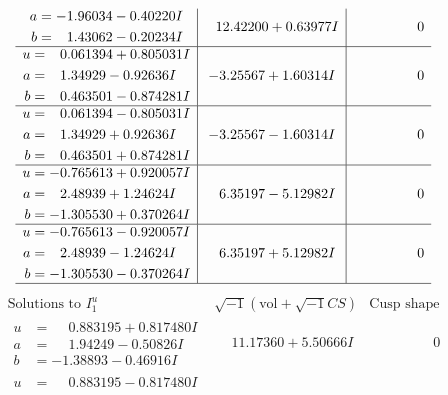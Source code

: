 \documentclass[1p]{elsarticle_modified}
\theoremstyle{definition}
\newcommand{\I}{\sqrt{-1}}
\begin{document}
$$\begin{array}{c|c|c}
\begin{aligned}
a &= -1.96034 - 0.40220 I \\
b &= \phantom{-}1.43062 - 0.20234 I\end{aligned}
 & \phantom{-}12.42200 + 0.63977 I & \phantom{-0.000000 } 0 \\ \hline\begin{aligned}
u &= \phantom{-}0.061394 + 0.805031 I \\
a &= \phantom{-}1.34929 - 0.92636 I \\
b &= \phantom{-}0.463501 - 0.874281 I\end{aligned}
 & -3.25567 + 1.60314 I & \phantom{-0.000000 } 0 \\ \hline\begin{aligned}
u &= \phantom{-}0.061394 - 0.805031 I \\
a &= \phantom{-}1.34929 + 0.92636 I \\
b &= \phantom{-}0.463501 + 0.874281 I\end{aligned}
 & -3.25567 - 1.60314 I & \phantom{-0.000000 } 0 \\ \hline\begin{aligned}
u &= -0.765613 + 0.920057 I \\
a &= \phantom{-}2.48939 + 1.24624 I \\
b &= -1.305530 + 0.370264 I\end{aligned}
 & \phantom{-}6.35197 - 5.12982 I & \phantom{-0.000000 } 0 \\ \hline\begin{aligned}
u &= -0.765613 - 0.920057 I \\
a &= \phantom{-}2.48939 - 1.24624 I \\
b &= -1.305530 - 0.370264 I\end{aligned}
 & \phantom{-}6.35197 + 5.12982 I & \phantom{-0.000000 } 0\\
 \hline 
 \end{array}$$\newpage$$\begin{array}{c|c|c}  
\text{Solutions to }I^u_{1}& \I (\text{vol} + \sqrt{-1}CS) & \text{Cusp shape}\\
 \hline 
\begin{aligned}
u &= \phantom{-}0.883195 + 0.817480 I \\
a &= \phantom{-}1.94249 - 0.50826 I \\
b &= -1.38893 - 0.46916 I\end{aligned}
 & \phantom{-}11.17360 + 5.50666 I & \phantom{-0.000000 } 0 \\ \hline\begin{aligned}
u &= \phantom{-}0.883195 - 0.817480 I \\

\end{aligned}
\end{array}$$
\end{document}
